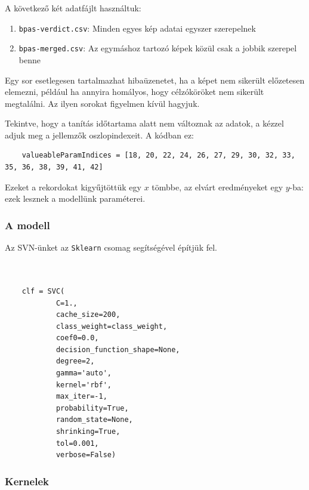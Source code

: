 \noindent
A következő két adatfájlt használtuk:

\begin{enumerate}
\item
	\texttt{bpas-verdict.csv}: Minden egyes kép adatai egyszer szerepelnek
\item
	\texttt{bpas-merged.csv}: Az egymáshoz tartozó képek közül csak a jobbik szerepel benne
\end{enumerate}

Egy sor esetlegesen tartalmazhat hibaüzenetet, ha a képet nem sikerült előzetesen elemezni, például 
ha annyira homályos, hogy célzóköröket nem sikerült megtalálni. Az ilyen sorokat figyelmen kívül hagyjuk.

Tekintve, hogy a tanítás időtartama alatt nem változnak az adatok, a kézzel adjuk
meg a jellemzők oszlopindexeit. A kódban ez:
\begin{lstlisting}  
	valueableParamIndices = [18, 20, 22, 24, 26, 27, 29, 30, 32, 33, 35, 36, 38, 39, 41, 42]
\end{lstlisting}

Ezeket a rekordokat kigyűjtöttük egy $ x $ tömbbe, az elvárt eredményeket egy $ y $-ba:
ezek lesznek a modellünk paraméterei.



\subsubsection{A modell}

Az SVN-ünket az \texttt{Sklearn} csomag segítségével építjük fel. 


\begin{lstlisting}  


	clf = SVC(
			C=1., 
			cache_size=200, 
			class_weight=class_weight, 
			coef0=0.0,
			decision_function_shape=None, 
			degree=2, 
			gamma='auto', 
			kernel='rbf',
			max_iter=-1,
			probability=True, 
			random_state=None, 
			shrinking=True,
			tol=0.001, 
			verbose=False)

\end{lstlisting}




\subsubsection{Kernelek}

